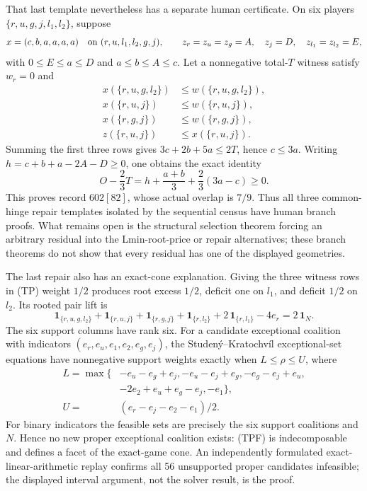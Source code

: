 \documentclass[11pt]{article}
\newcommand{\one}{\mathbf 1}
\begin{document}
That last template nevertheless has a separate human certificate.  On six
players $\{r,u,g,j,l_1,l_2\}$, suppose
\[
 x=(c,b,a,a,a,a)\quad\hbox{on }(r,u,l_1,l_2,g,j),
 \qquad z_r=z_u=z_g=A,\quad z_j=D,\quad z_{l_1}=z_{l_2}=E,
\]
with $0\le E\le a\le D$ and $a\le b\le A\le c$.  Let a nonnegative
total-$T$ witness satisfy $w_r=0$ and
\[
\begin{split}
 x(\{r,u,g,l_2\})&\le w(\{r,u,g,l_2\}),\\
 x(\{r,u,j\})&\le w(\{r,u,j\}),\\
 x(\{r,g,j\})&\le w(\{r,g,j\}),\\
 z(\{r,u,j\})&\le x(\{r,u,j\}).
\end{split}                                             \tag{TP}
\]
Summing the first three rows gives $3c+2b+5a\le2T$, hence $c\le3a$.
Writing $h=c+b+a-2A-D\ge0$, one obtains the exact identity
\[
 O-\frac23T=h+\frac{a+b}{3}+\frac23(3a-c)\ge0.       \tag{TPI}
\]
This proves record $602[82]$, whose actual overlap is $7/9$.  Thus all three
common-hinge repair templates isolated by the sequential census have human
branch proofs.  What remains open is the structural selection theorem forcing
an arbitrary residual into the Lmin-root-price or repair alternatives; these
branch theorems do not show that every residual has one of the displayed
geometries.

The last repair also has an exact-cone explanation.  Giving the three witness
rows in (TP) weight $1/2$ produces root excess $1/2$, deficit one on $l_1$,
and deficit $1/2$ on $l_2$.  Its rooted pair lift is
\[
 \one_{\{r,u,g,l_2\}}+\one_{\{r,u,j\}}+\one_{\{r,g,j\}}
 +\one_{\{r,l_2\}}+2\,\one_{\{r,l_1\}}-4e_r=2\,\one_N. \tag{TPF}
\]
The six support columns have rank six.  For a candidate exceptional
coalition with indicators $(e_r,e_u,e_1,e_2,e_g,e_j)$, the
Studen\'y--Kratochv\'il exceptional-set equations have nonnegative support
weights exactly when $L\le\rho\le U$, where
\[
\begin{split}
L=\max\{&-e_u-e_g+e_j,-e_u-e_j+e_g,-e_g-e_j+e_u,\\
        &-2e_2+e_u+e_g-e_j,-e_1\},\\
U={}&(e_r-e_j-e_2-e_1)/2.
\end{split}                                             \tag{TPE}
\]
For binary indicators the feasible sets are precisely the six support
coalitions and $N$.  Hence no new proper exceptional coalition exists:
(TPF) is indecomposable and defines a facet of the exact-game cone.  An
independently formulated exact-linear-arithmetic replay confirms all 56
unsupported proper candidates infeasible; the displayed interval argument,
not the solver result, is the proof.
\end{document}
